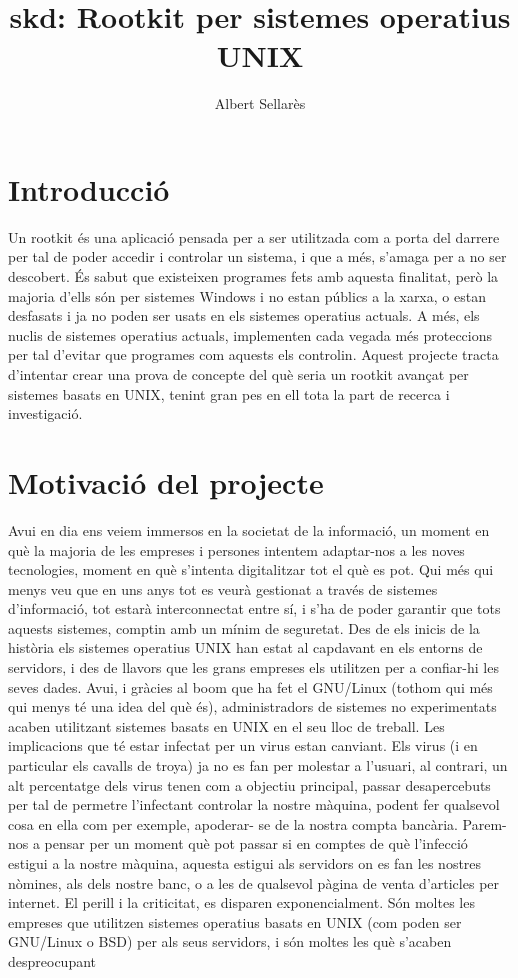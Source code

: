 \documentclass[a4paper]{article}
\author{Albert Sellarès}
\title{skd: Rootkit per sistemes operatius UNIX}
\begin{document}
\maketitle
\newpage

\tableofcontents
\newpage

\section{Introducció}

Un rootkit és una aplicació pensada per a ser utilitzada com a porta del darrere per tal de
poder accedir i controlar un sistema, i que a més, s'amaga per a no ser descobert.
És sabut que existeixen programes fets amb aquesta finalitat, però la majoria d'ells són
per sistemes Windows i no estan públics a la xarxa, o estan desfasats i ja no poden ser
usats en els sistemes operatius actuals.
A més, els nuclis de sistemes operatius actuals, implementen cada vegada més
proteccions per tal d'evitar que programes com aquests els controlin.
Aquest projecte tracta d'intentar crear una prova de concepte del què seria un rootkit
avançat per sistemes basats en UNIX, tenint gran pes en ell tota la part de recerca i
investigació.

\section{Motivació del projecte}

Avui en dia ens veiem immersos en la societat de la informació, un moment en què la
majoria de les empreses i persones intentem adaptar-nos a les noves tecnologies,
moment en què s'intenta digitalitzar tot el què es pot.
Qui més qui menys veu que en uns anys tot es veurà gestionat a través de sistemes
d'informació, tot estarà interconnectat entre sí, i s'ha de poder garantir que tots aquests
sistemes, comptin amb un mínim de seguretat.
Des de els inicis de la història els sistemes operatius UNIX han estat al capdavant en els
entorns de servidors, i des de llavors que les grans empreses els utilitzen per a confiar-hi
les seves dades. Avui, i gràcies al boom que ha fet el GNU/Linux (tothom qui més qui
menys té una idea del què és), administradors de sistemes no experimentats acaben
utilitzant sistemes basats en UNIX en el seu lloc de treball.
Les implicacions que té estar infectat per un virus estan canviant. Els virus (i en particular
els cavalls de troya) ja no es fan per molestar a l'usuari, al contrari, un alt percentatge dels
virus tenen com a objectiu principal, passar desapercebuts per tal de permetre l'infectant
controlar la nostre màquina, podent fer qualsevol cosa en ella com per exemple, apoderar-
se de la nostra compta bancària.
Parem-nos a pensar per un moment què pot passar si en comptes de què l'infecció estigui
a la nostre màquina, aquesta estigui als servidors on es fan les nostres nòmines, als dels
nostre banc, o a les de qualsevol pàgina de venta d'articles per internet. El perill i la
criticitat, es disparen exponencialment.
Són moltes les empreses que utilitzen sistemes operatius basats en UNIX (com poden ser
GNU/Linux o BSD) per als seus servidors, i són moltes les què s'acaben despreocupant
\end{document}

